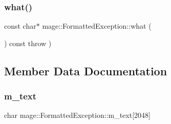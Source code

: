 \hypertarget{structmage_1_1_formatted_exception_aec9ca8402604df35b702e8d29672a3df}{}\label{structmage_1_1_formatted_exception_aec9ca8402604df35b702e8d29672a3df} 
\subsubsection{\texorpdfstring{what()}{what()}}
{\footnotesize\ttfamily const char$\ast$ mage\+::\+Formatted\+Exception\+::what (\begin{DoxyParamCaption}{ }\end{DoxyParamCaption}) const throw  ) }



\subsection{Member Data Documentation}
\hypertarget{structmage_1_1_formatted_exception_aadccdcc1db09285dadc6b5a30681e05b}{}\label{structmage_1_1_formatted_exception_aadccdcc1db09285dadc6b5a30681e05b} 
\subsubsection{\texorpdfstring{m\+\_\+text}{m\_text}}
{\footnotesize\ttfamily char mage\+::\+Formatted\+Exception\+::m\+\_\+text\mbox{[}2048\mbox{]}\hspace{0.3cm}{\ttfamily [private]}}

